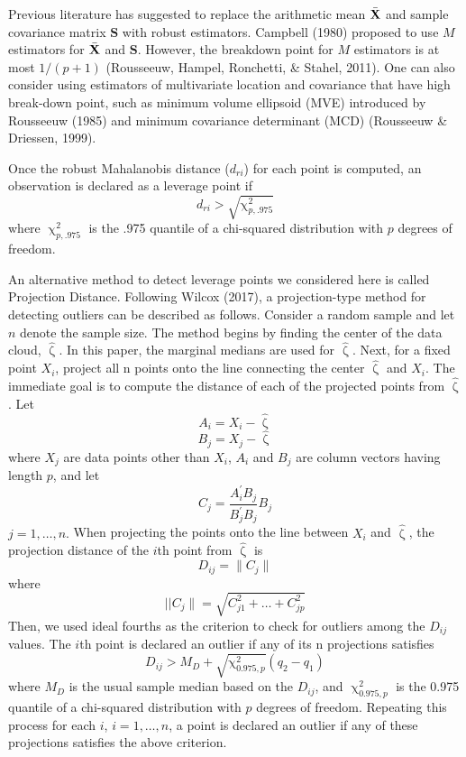 \documentclass[
  man]{apa7}
\let\chi\upchi
\let\zeta\upzeta
\begin{document}
Previous literature has suggested to replace the arithmetic mean \(\bar{\bf X}\) and sample covariance matrix \(\textbf{S}\) with robust estimators. Campbell (1980) proposed to use \(\textit{M}\) estimators for \(\bar{\bf X}\) and \(\textbf{S}\). However, the breakdown point for \(\textit{M}\) estimators is at most \(1/(p+1)\) (Rousseeuw, Hampel, Ronchetti, \& Stahel, 2011). One can also consider using estimators of multivariate location and covariance that have high break-down point, such as minimum volume ellipsoid (MVE) introduced by Rousseeuw (1985) and minimum covariance determinant (MCD) (Rousseeuw \& Driessen, 1999).

Once the robust Mahalanobis distance (\(d_{ri}\)) for each point is computed, an observation is declared as a leverage point if
\begin{equation}
d_{ri} > \sqrt{\chi^{2}_{p, .975}}
\end{equation}
where \(\chi^{2}_{p, .975}\) is the .975 quantile of a chi-squared distribution with \(p\) degrees of freedom.

An alternative method to detect leverage points we considered here is called Projection Distance. Following Wilcox (2017), a projection-type method for detecting outliers can be described as follows. Consider a random sample and let \(n\) denote the sample size.
The method begins by finding the center of the data cloud, \(\hat{\zeta}\). In this paper, the marginal medians are used for \(\hat{\zeta}\). Next, for a fixed point \(X_{i}\), project all n points onto the line connecting the center \(\hat{\zeta}\) and \(X_{i}\).
The immediate goal is to compute the distance of each of the projected
points from \(\hat{\zeta}\). Let
\begin{equation}
A_{i} = X_{i} - \hat{\zeta}
\end{equation}
\begin{equation}
B_{j} = X_{j} - \hat{\zeta}
\end{equation}
where \(X_{j}\) are data points other than \(X_{i}\), \(A_{i}\) and \(B_{j}\) are column vectors having length \(p\), and let
\begin{equation}
C_{j} = \frac{A_{i}^{'}B_{j}}{B_{j}^{'}B_{j}}B_{j}
\end{equation}
\(j=1,\ldots,n.\) When projecting the points onto the line between \(X_{i}\) and \(\hat{\zeta}\), the projection distance of the \(i\)th point from \(\hat{\zeta}\) is
\[D_{ij} = \|C_{j}\|\]
where
\begin{equation}
    ||C_{j}\| = \sqrt{C_{j1}^{2} + \ldots + C_{jp}^{2}}
\end{equation}
Then, we used ideal fourths as the criterion to check for outliers among the \(D_{ij}\) values. The \(i\)th point is declared an outlier if any of its n projections satisfies
\begin{equation}
D_{ij} > M_{D} + \sqrt{\chi^{2}_{0.975,p}}(q_{2}-q_{1})
\end{equation}
where \(M_{D}\) is the usual sample median based on the \(D_{ij}\), and \(\chi^{2}_{0.975,p}\) is the 0.975 quantile of a chi-squared distribution with \(p\) degrees of freedom. Repeating this process for each \(i\), \(i = 1, \ldots, n\), a point is declared an outlier if any of these projections satisfies the above criterion.
\end{document}
